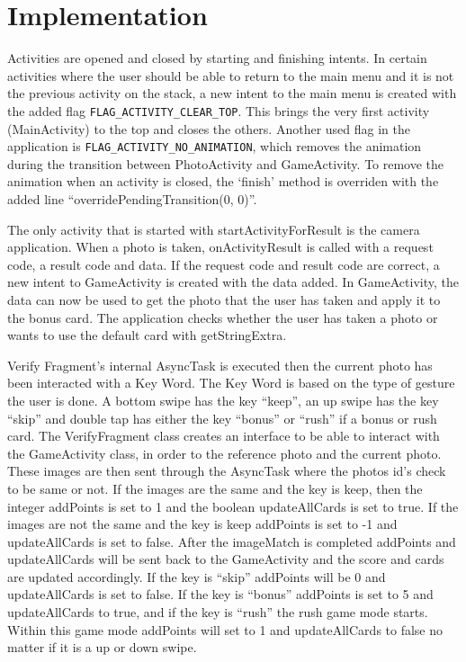 \section{Implementation}
Activities are opened and closed by starting and finishing intents. In certain activities where the user should be able to return to the main menu and it is not the previous activity on the stack, a new intent to the main menu is created with the added flag \verb|FLAG_ACTIVITY_CLEAR_TOP|. This brings the very first activity (MainActivity) to the top and closes the others. Another used flag in the application is \verb|FLAG_ACTIVITY_NO_ANIMATION|, which removes the animation during the transition between PhotoActivity and GameActivity. To remove the animation when an activity is closed, the ‘finish’ method is overriden with the added line “overridePendingTransition(0, 0)”. \newline

The only activity that is started with startActivityForResult is the camera application. When a photo is taken, onActivityResult is called with a request code, a result code and data. If the request code and result code are correct, a new intent to GameActivity is created with the data added. In GameActivity, the data can now be used to get the photo that the user has taken and apply it to the bonus card. The application checks whether the user has taken a photo or wants to use the default card with getStringExtra. \newline

Verify Fragment’s internal AsyncTask is executed then the current photo has been interacted with a Key Word. The Key Word is based on the type of gesture the user is done. A bottom swipe has the key “keep”, an up swipe has the key “skip” and double tap has either the key “bonus” or “rush” if a bonus or rush card.  The VerifyFragment class creates an interface to be able to interact with the GameActivity class, in order to the reference photo and the current photo. These images are then sent through the AsyncTask where the photos id’s check to be same or not.  If the images are the same and the key is keep, then the integer addPoints is set to 1 and the boolean updateAllCards is set to true. If the images are not the same and the key is keep addPoints is set to -1 and updateAllCards is set to false. After the imageMatch is completed addPoints and updateAllCards will be sent back to the GameActivity and the score and cards are updated accordingly. If the key is “skip” addPoints will be 0 and updateAllCards is set to false. If the key is “bonus” addPoints is set to 5 and updateAllCards to true, and if the key is “rush” the rush game mode starts. Within this game mode addPoints will set to 1 and updateAllCards to false no matter if it is a up or down swipe. \newline


